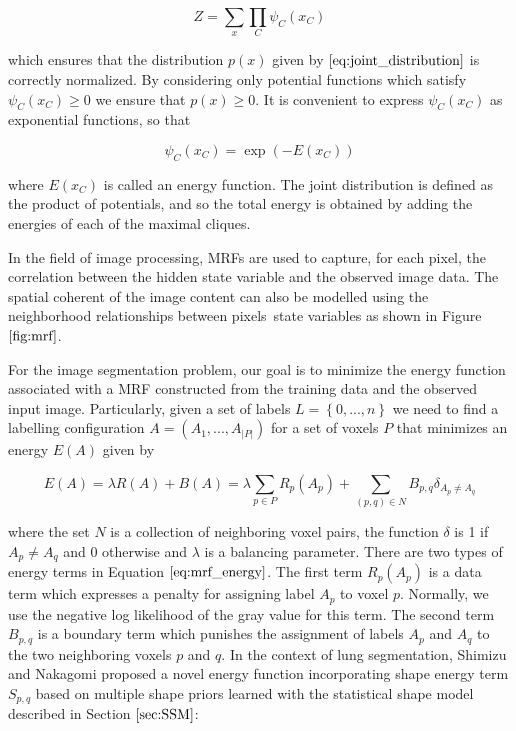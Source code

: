 \documentclass{SMBV12}
\begin{document}
\begin{equation}
Z = \sum\limits_{x} \prod\limits_{C} \psi_C(x_C)
\end{equation}

which ensures that the distribution $p(x)$ given by $\ref{eq:joint_distribution}$ is correctly normalized. By considering only potential functions which satisfy $\psi_C(x_C) \geq 0$ we ensure that $p(x) \geq 0$. It is convenient to express $\psi_C(x_C)$ as exponential functions, so that

\begin{equation}
\psi_C(x_C) = \exp \left( -E(x_C) \right) 
\end{equation}

where $E(x_C)$ is called an energy function. The joint distribution is defined as the product of potentials, and so the total energy is obtained by adding the energies of each of the maximal cliques.

In the field of image processing, MRFs are used to capture, for each pixel, the correlation between the hidden state variable and the observed image data. The spatial coherent of the image content can also be modelled using the neighborhood relationships between pixels\textquotesingle \ state variables as shown in Figure $\ref{fig:mrf}$. 

For the image segmentation problem, our goal is to minimize the energy function associated with a MRF constructed from the training data and the observed input image. Particularly, given a set of labels $L = \left\lbrace 0, ..., n \right\rbrace $ we need to find a labelling configuration $A = (A_1, ..., A_{\lvert P \rvert})$ for a set of voxels $P$ that minimizes an energy $E(A)$ given by

\begin{equation}
E(A) = \lambda R(A) + B(A) = \lambda \sum_{p \in P} R_p(A_p) + \sum_{(p, q) \in N} B_{p, q} \delta_{A_p \neq A_q}
\label{eq:mrf_energy}
\end{equation}

where the set $N$ is a collection of neighboring voxel pairs, the function $\delta$ is 1 if $A_p \neq A_q$ and 0 otherwise and $\lambda$ is a balancing parameter. There are two types of energy terms in Equation $\ref{eq:mrf_energy}$. The first term $R_p(A_p)$ is a data term which expresses a penalty for assigning label $A_p$ to voxel $p$. Normally, we use the negative log likelihood of the gray value for this term. The second term $B_{p, q}$ is a boundary term which punishes the assignment of labels $A_p$ and $A_q$ to the two neighboring voxels $p$ and $q$. In the context of lung segmentation, Shimizu and Nakagomi \cite{shimizu2011automated} \cite{nakagomimulti} proposed a novel energy function incorporating shape energy term $S_{p, q}$ based on multiple shape priors learned with the statistical shape model described in Section $\ref{sec:SSM}$:
\end{document}
